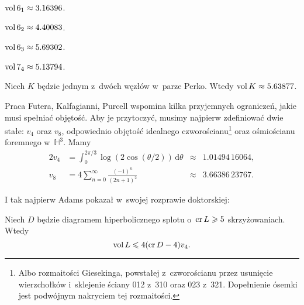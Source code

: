\begin{example}
    $\operatorname{vol} 6_1 \approx 3.16396$.
\end{example}

\begin{example}
    $\operatorname{vol} 6_2 \approx 4.40083$.
\end{example}

\begin{example}
    $\operatorname{vol} 6_3 \approx 5.69302$.
\end{example}

\begin{example}
    $\operatorname{vol} 7_4 \approx 5.13794$.
\end{example}

\begin{example}
%
    Niech $K$ będzie jednym z~dwóch węzłów w~parze Perko.
    Wtedy $\operatorname{vol} K \approx 5.63877$.
\end{example}

Praca Futera, Kalfagianni, Purcell \cite{purcell19} wspomina kilka przyjemnych ograniczeń, jakie musi spełniać objętość.
%
%
%
Aby je przytoczyć, musimy najpierw zdefiniować dwie stałe: $v_4$ oraz $v_8$, odpowiednio objętość idealnego czworościanu\footnote{Albo rozmaitości Giesekinga, powstałej z~czworościanu przez usunięcie  wierzchołków i~sklejenie ściany 012 z~310 oraz 023 z~321. Dopełnienie ósemki jest podwójnym nakryciem tej rozmaitości.} oraz ośmiościanu foremnego w~$\mathbb H^3$.
Mamy
\begin{alignat}{2}
    v_4 & = \int_{0}^{2\pi/3} \log(2 \cos(\theta/2)) \,\mathrm{d}\theta & {}\approx{} & 1.01494\,16064, \\
    v_8 & = 4 \sum_{n=0}^\infty \frac{(-1)^n}{(2n+1)^2} &{}\approx{}& 3.66386\,23767.
\end{alignat}

I tak najpierw Adams \cite{adams83} pokazał w~swojej rozprawie doktorskiej:
%

\begin{proposition}
    Niech $D$ będzie diagramem hiperbolicznego splotu o~$\operatorname{cr} L \geqslant 5$ skrzyżowaniach.
    Wtedy
    \begin{equation}
        \operatorname{vol} L \leqslant 4 (\operatorname{cr} D - 4) v_4.
    \end{equation}
\end{proposition}

